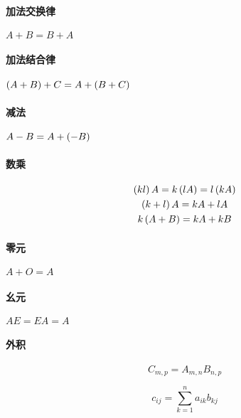 \documentclass{article}
\begin{document}
\paragraph{加法交换律}$A+B=B+A$

\paragraph{加法结合律}$\left(A+B\right)+C=A+\left(B+C\right)$

\paragraph{减法}$A-B=A+\left(-B\right)$

\paragraph{数乘}

\[\begin{gathered}
        \left(kl\right)A=k\left(lA\right)=l\left(kA\right)\\
        \left(k+l\right)A=kA+lA\\
        k\left(A+B\right)=kA+kB
    \end{gathered}\]

\paragraph{零元}$A+O=A$

\paragraph{幺元}$AE=EA=A$

\paragraph{外积}

\[C_{m,p}=A_{m,n}B_{n,p}\]

\[c_{ij}=\sum_{k=1}^na_{ik}b_{kj}\]
\end{document}
